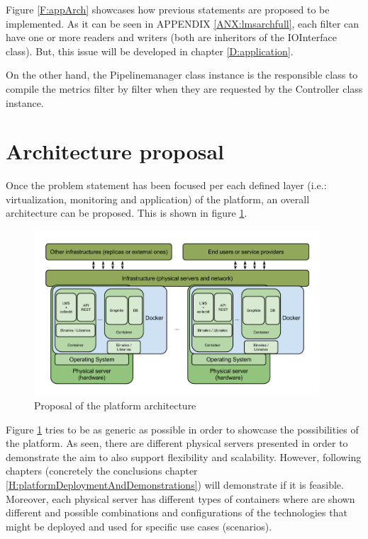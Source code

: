 Figure \ref{F:appArch} showcases how previous statements are proposed to be implemented. As it can be seen in APPENDIX \ref{ANX:lmsarchfull}, each filter can have one or more readers and writers (both are inheritors of the IOInterface class). But, this issue will be developed in chapter \ref{D:application}.

On the other hand, the Pipelinemanager class instance is the responsible class to compile the metrics filter by filter when they are requested by the Controller class instance. 

\section{Architecture proposal}

Once the problem statement has been focused per each defined layer (i.e.: virtualization, monitoring and application) of the platform, an overall architecture can be proposed. This is shown in figure \ref{F:overallArchProp}.

\begin{figure}[!htb]
\begin{center}
\includegraphics[width=0.95\textwidth]{./images/overallArchProp.png}
\caption{Proposal of the platform architecture}
\label{F:overallArchProp}
\end{center}
\end{figure}

Figure \ref{F:overallArchProp} tries to be as generic as possible in order to showcase the possibilities of the platform. As seen, there are different physical servers presented in order to demonstrate the aim to also support flexibility and scalability. However, following chapters (concretely the conclusions chapter \ref{H:platformDeploymentAndDemonstrations}) will demonstrate if it is feasible. 
Moreover, each physical server has different types of containers where are shown different and possible combinations and configurations of the technologies that might be deployed and used for specific use cases (scenarios).

